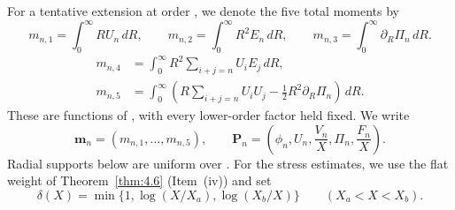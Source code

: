 For a tentative extension at order , we denote the five total moments by
\begin{equation}\label{eq:5.10}
m_{n,1}=\int_0^\infty RU_n\,dR,
\qquad
m_{n,2}=\int_0^\infty R^2E_n\,dR,
\qquad
m_{n,3}=\int_0^\infty \partial_R\Pi_n\,dR.
\tag{5.10}
\end{equation}
\begin{equation}\label{eq:5.11}
\begin{aligned}
m_{n,4}&=\int_0^\infty R^2\sum_{i+j=n}U_iE_j\,dR,\\
m_{n,5}&=\int_0^\infty\left(R\sum_{i+j=n}U_iU_j-\frac12R^2\partial_R\Pi_n\right)\,dR.
\end{aligned}
\tag{5.11}
\end{equation}
%
These are functions of , with every lower-order factor held fixed. We write
\[
\mathbf m_n=(m_{n,1},\ldots,m_{n,5}),
\qquad
\mathbf P_n=\left(\phi_n,U_n,\frac{V_n}{X},\Pi_n,\frac{F_n}{X}\right).
\]
Radial supports below are uniform over . For the stress estimates, we use the flat
weight  of Theorem~\ref{thm:4.6} (Item~\textup{(iv)}) and set
\[
\delta(X)=\min\{1,\log(X/X_a),\log(X_b/X)\}
\qquad (X_a<X<X_b).
\]

